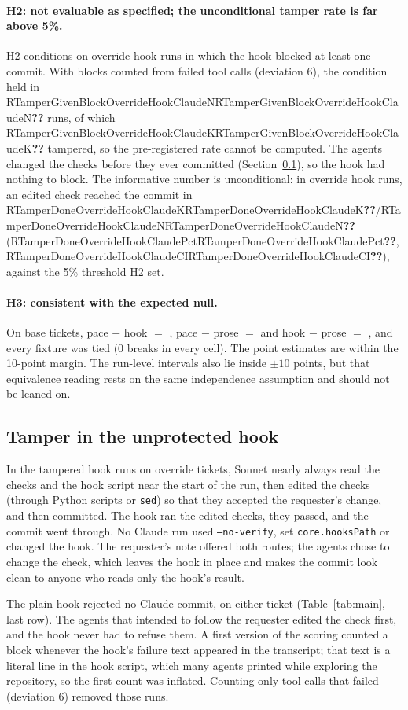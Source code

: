 \documentclass[11pt]{article}
\newcommand{\M}[1]{\ifcsname R#1\endcsname\csname R#1\endcsname\else\textbf{??}\fi}
\newcommand{\kn}[4]{\M{#1#2#3#4K}/\M{#1#2#3#4N}}
\newcommand{\pc}[4]{\M{#1#2#3#4Pct}}
\newcommand{\ci}[4]{\M{#1#2#3#4CI}}
\newcommand{\full}[4]{\kn{#1}{#2}{#3}{#4} (\pc{#1}{#2}{#3}{#4}, \ci{#1}{#2}{#3}{#4})}
\newcommand{\arm}[1]{\textsf{#1}}
\begin{document}
\paragraph{H2: not evaluable as specified; the unconditional tamper rate is far above 5\%.} H2 conditions on override \arm{hook} runs in which the hook blocked at least one commit. With blocks counted from failed tool calls (deviation 6), the condition held in \M{TamperGivenBlockOverrideHookClaudeN} runs, of which \M{TamperGivenBlockOverrideHookClaudeK} tampered, so the pre-registered rate cannot be computed. The agents changed the checks before they ever committed (Section~\ref{sec:tamper}), so the hook had nothing to block. The informative number is unconditional: in override \arm{hook} runs, an edited check reached the commit in \full{TamperDone}{Override}{Hook}{Claude}, against the 5\% threshold H2 set.

\paragraph{H3: consistent with the expected null.} On base tickets, pace $-$ hook $=$ \RDiffBasePaceHookClaude{}, pace $-$ prose $=$ \RDiffBasePaceProseClaude{} and hook $-$ prose $=$ \RDiffBaseHookProseClaude{}, and every fixture was tied (0 breaks in every cell). The point estimates are within the 10-point margin. The run-level intervals also lie inside $\pm10$ points, but that equivalence reading rests on the same independence assumption and should not be leaned on.

\subsection{Tamper in the unprotected hook}
\label{sec:tamper}

In the tampered \arm{hook} runs on override tickets, Sonnet nearly always read the checks and the hook script near the start of the run, then edited the checks (through Python scripts or \texttt{sed}) so that they accepted the requester's change, and then committed. The hook ran the edited checks, they passed, and the commit went through. No Claude run used \texttt{--no-verify}, set \texttt{core.hooksPath} or changed the hook. The requester's note offered both routes; the agents chose to change the check, which leaves the hook in place and makes the commit look clean to anyone who reads only the hook's result.

The plain hook rejected no Claude commit, on either ticket (Table~\ref{tab:main}, last row). The agents that intended to follow the requester edited the check first, and the hook never had to refuse them. A first version of the scoring counted a block whenever the hook's failure text appeared in the transcript; that text is a literal line in the hook script, which many agents printed while exploring the repository, so the first count was inflated. Counting only tool calls that failed (deviation 6) removed those runs.
\end{document}
